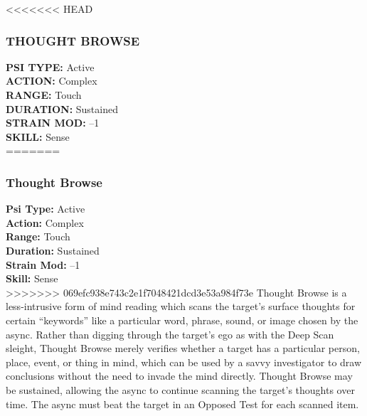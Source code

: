<<<<<<< HEAD \subsubsection{THOUGHT BROWSE} \textbf{PSI TYPE:} Active \\ \textbf{ACTION:} Complex \\ \textbf{RANGE:} Touch \\ \textbf{DURATION:} Sustained \\ \textbf{STRAIN MOD:} –1 \\ \textbf{SKILL:} Sense\\ ======= \subsubsection{Thought Browse} \textbf{Psi Type:} Active \\ \textbf{Action:} Complex \\ \textbf{Range:} Touch \\ \textbf{Duration:} Sustained \\ \textbf{Strain Mod:} –1 \\ \textbf{Skill:} Sense\\ >>>>>>> 069efc938e743c2e1f7048421dcd3e53a984f73e Thought Browse is a less-intrusive form of mind reading which scans the target’s surface thoughts for certain “keywords” like a particular word, phrase, sound, or image chosen by the async. Rather than digging through the target’s ego as with the Deep Scan sleight, Thought Browse merely verifies whether a target has a particular person, place, event, or thing in mind, which can be used by a savvy investigator to draw conclusions without the need to invade the mind directly. Thought Browse may be sustained, allowing the async to continue scanning the target’s thoughts over time. The async must beat the target in an Opposed Test for each scanned item. 

